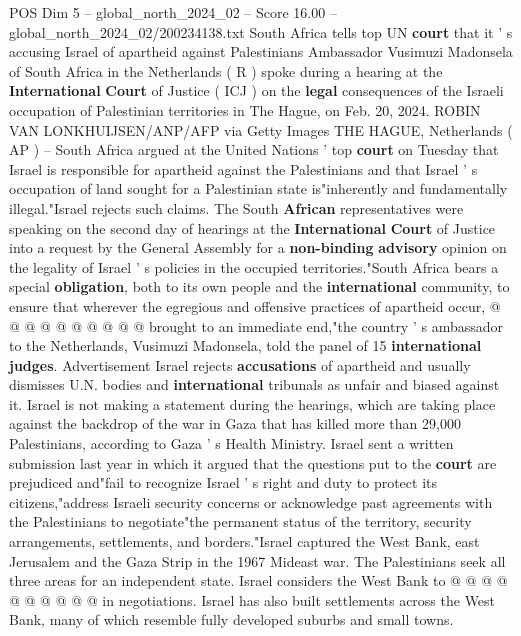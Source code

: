 \begin{textsample}{POS Dim 5 – global\_north\_2024\_02 – Score 16.00 – global\_north\_2024\_02/200234138.txt}  \label{ex:f5_pos_247}
South Africa tells top UN \textbf{court} that it ' s accusing Israel of apartheid against Palestinians Ambassador Vusimuzi Madonsela of South Africa in the Netherlands ( R ) spoke during a hearing at the \textbf{International} \textbf{Court} of Justice ( ICJ ) on the \textbf{legal} consequences of the Israeli occupation of Palestinian territories in The Hague, on Feb. 20, 2024.
ROBIN VAN LONKHUIJSEN/ANP/AFP via Getty Images THE HAGUE, Netherlands ( AP ) -- South Africa argued at the United Nations ' top \textbf{court} on Tuesday that Israel is responsible for apartheid against the Palestinians and that Israel ' s occupation of land sought for a Palestinian state is"inherently and fundamentally illegal."Israel rejects such claims.
The South \textbf{African} representatives were speaking on the second day of hearings at the \textbf{International} \textbf{Court} of Justice into a request by the General Assembly for a \textbf{non-binding} \textbf{advisory} opinion on the legality of Israel ' s policies in the occupied territories."South Africa bears a special \textbf{obligation}, both to its own people and the \textbf{international} community, to ensure that wherever the egregious and offensive practices of apartheid occur, @ @ @ @ @ @ @ @ @ @ brought to an immediate end,"the country ' s ambassador to the Netherlands, Vusimuzi Madonsela, told the panel of 15 \textbf{international} \textbf{judges}.
Advertisement Israel rejects \textbf{accusations} of apartheid and usually dismisses U.N. bodies and \textbf{international} tribunals as unfair and biased against it.
Israel is not making a statement during the hearings, which are taking place against the backdrop of the war in Gaza that has killed more than 29,000 Palestinians, according to Gaza ' s Health Ministry.
Israel sent a written submission last year in which it argued that the questions put to the \textbf{court} are prejudiced and"fail to recognize Israel ' s right and duty to protect its citizens,"address Israeli security concerns or acknowledge past agreements with the Palestinians to negotiate"the permanent status of the territory, security arrangements, settlements, and borders."Israel captured the West Bank, east Jerusalem and the Gaza Strip in the 1967 Mideast war.
The Palestinians seek all three areas for an independent state.
Israel considers the West Bank to @ @ @ @ @ @ @ @ @ @ in negotiations.
Israel has also built settlements across the West Bank, many of which resemble fully developed suburbs and small towns.

\end{textsample}

